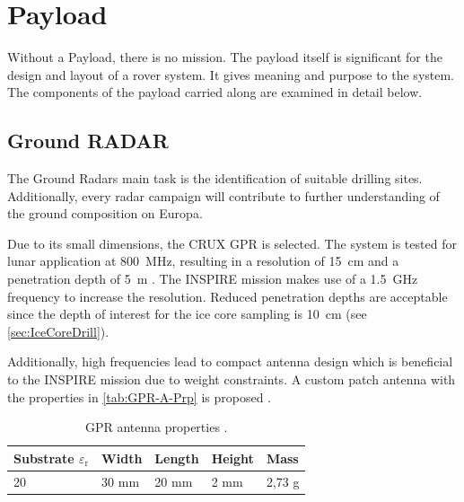 
\chapter{Payload}
\label{chap:payload}

Without a Payload, there is no mission. The payload itself is significant for the design and layout of a rover system. It gives meaning and purpose to the system. The components of the payload carried along are examined in detail below. 

\section{Ground RADAR}
The Ground Radars main task is the identification of suitable drilling sites. Additionally, every radar campaign will contribute to further understanding of the ground composition on Europa.

Due to its small dimensions, the CRUX GPR is selected. The system is tested for lunar application at 800~MHz, resulting in a resolution of 15~cm and a penetration depth of 5~m \cite{CRUX_GPR}. The INSPIRE mission makes use of a 1.5~GHz frequency to increase the resolution. 
Reduced penetration depths are acceptable since the depth of interest for the ice core sampling is 10~cm (see \autoref{sec:IceCoreDrill}).

Additionally, high frequencies lead to compact antenna design which is beneficial to the INSPIRE mission due to weight constraints. 
A custom patch antenna with the properties in \autoref{tab:GPR-A-Prp} is proposed \cite{patch_ant_GPR, Patch_Ant_design}.

\begin{table}[h]
\centering
\begin{tabular}{lllll}
\toprule
Substrate ${\varepsilon}_\text{r}$ & Width & Length & Height & Mass   \\
\midrule
20                         & 30 mm & 20 mm  & 2 mm   & 2,73 g  \\
\bottomrule
\end{tabular}
\caption{GPR antenna properties \cite{Patch_Ant_design}.}
\label{tab:GPR-A-Prp}
\end{table}

